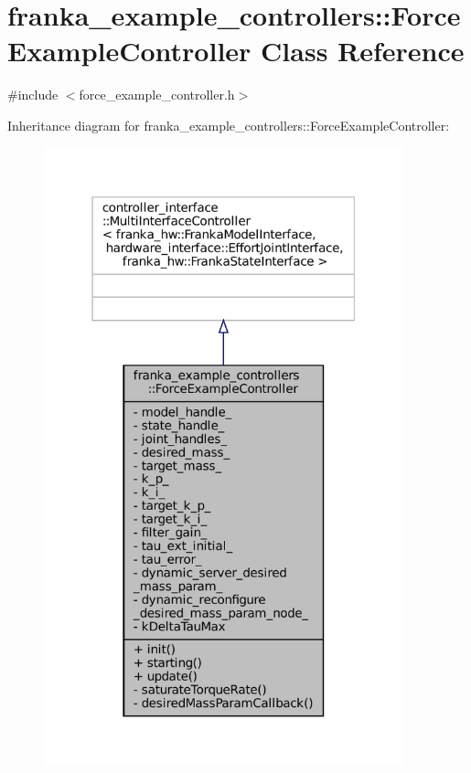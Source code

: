 \hypertarget{classfranka__example__controllers_1_1ForceExampleController}{}\section{franka\+\_\+example\+\_\+controllers\+:\+:Force\+Example\+Controller Class Reference}
\label{classfranka__example__controllers_1_1ForceExampleController}


{\ttfamily \#include $<$force\+\_\+example\+\_\+controller.\+h$>$}



Inheritance diagram for franka\+\_\+example\+\_\+controllers\+:\+:Force\+Example\+Controller\+:
\nopagebreak
\begin{figure}[H]
\begin{center}
\leavevmode
\includegraphics[width=295pt]{classfranka__example__controllers_1_1ForceExampleController__inherit__graph}
\end{center}
\end{figure}


